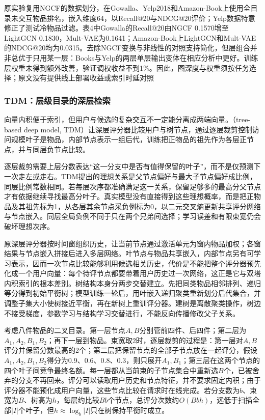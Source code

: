 原实验复用NGCF的数据划分，在Gowalla、Yelp2018和Amazon-Book上使用全目录未交互物品排名，嵌入维度64，以Recall@20与NDCG@20评价；Yelp数据特意修正了测试冷物品过滤。表4中Gowalla的Recall@20由NGCF 0.1570增至LightGCN 0.1830，Mult-VAE为0.1641；Amazon-Book上LightGCN和Mult-VAE的NDCG@20均为0.0315。去除NGCF变换与非线性的对照支持简化，但层组合并非总优于只用某一层：Books与Yelp的两层单层输出变体在相应分析中更好。训练层权重未得到额外改善，验证调权收益不到1\%。因此，图深度与权重须按任务选择；原文没有提供线上部署收益或索引时延对照

\Needspace{90mm}
\subsubsection{TDM：层级目录的深层检索}
\label{sec:rs-tdm}

向量内积便于索引，但用户与候选的复杂交互不一定能分离成两端向量。（tree-based deep model, TDM）让深层评分器比较用户与树节点，通过逐层裁剪控制访问规模叶子是物品，内部节点表示一组后代，训练把正物品的祖先作为各层正节点，并与同层负节点比较。

逐层裁剪需要上层分数表达“这一分支中是否有值得保留的叶子”，而不是仅预测下一次走左或走右。TDM提出的理想关系是父节点偏好与最大子节点偏好成比例，同层比例常数相同。若每层次序都准确满足这一关系，保留足够多的最高分父节点才有依据继续寻找最高分叶子。真实模型没有直接得到这些理想概率，而是把正物品及其祖先标为1，从各层其余节点采负例标为0，以二元交叉熵更新共享评分网络与节点嵌入。同层全局负例不同于只在两个兄弟间选择；学习误差和有限束宽仍会破坏理想次序。

原深层评分器按时间窗组织历史，让当前节点通过激活单元为窗内物品加权；各窗结果与节点嵌入拼接后进入多层网络。叶节点与物品共享嵌入，内部节点另有可学习表示，因而一次节点比较能够利用候选相关历史，代价是不能把整个评分器预先化成一个用户向量：每个待评节点都要带着用户历史过一次网络，这正是它与双塔内积索引的根本差别。树结构本身分两步交替建立。先把同类物品相邻排列、递归等分得到初始平衡树；模型训练一轮后，用叶嵌入递归聚类重新划分后代集合，并调整子集大小使树接近平衡，再在新树上重训评分器。建树是离散聚类操作，树边不接受梯度，参数学习与结构学习交替进行，不能反向传播修改父子关系。

考虑八件物品的二叉目录。第一层节点$A,B$分别管前四件、后四件；第二层为$A_1,A_2,B_1,B_2$；再下一层到物品。束宽取2时，逐层裁剪的过程是：第一层对$A,B$评分并保留分数最高的2个；第二层把保留节点的全部子节点放在一起评分，假设$A_1,A_2,B_1,B_2$得分为0.9、0.6、0.8、0.3，则只展开$A_1,B_1$；第三层在这两个节点的四个叶子间竞争最终名额。每一层都从当前束的子节点集合中重新选$B$个，已被舍弃的分支不再回来。评分可以读取用户历史和节点特征，并不要求固定内积；由于评分器不能预化成用户向量，这些节点比较在请求时在线完成。若分支数为$b$、束宽为$B$、树高为$h$，每层约比较$Bb$个节点，总评分次数约$O(Bbh)$，远低于扫描全部$|I|$个叶子，但$h\approx\log_b|I|$只在树保持平衡时成立。

